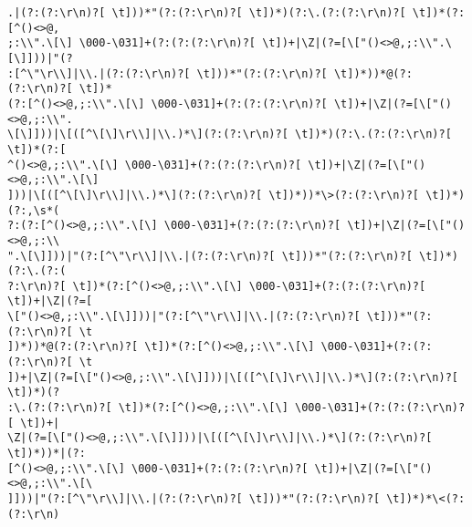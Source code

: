 \documentclass[14pt]{beamer}
\begin{document}
\begin{frame}[fragile]
\begin{lstlisting}
.|(?:(?:\r\n)?[ \t]))*"(?:(?:\r\n)?[ \t])*)(?:\.(?:(?:\r\n)?[ \t])*(?:[^()<>@,
;:\\".\[\] \000-\031]+(?:(?:(?:\r\n)?[ \t])+|\Z|(?=[\["()<>@,;:\\".\[\]]))|"(?
:[^\"\r\\]|\\.|(?:(?:\r\n)?[ \t]))*"(?:(?:\r\n)?[ \t])*))*@(?:(?:\r\n)?[ \t])*
(?:[^()<>@,;:\\".\[\] \000-\031]+(?:(?:(?:\r\n)?[ \t])+|\Z|(?=[\["()<>@,;:\\".
\[\]]))|\[([^\[\]\r\\]|\\.)*\](?:(?:\r\n)?[ \t])*)(?:\.(?:(?:\r\n)?[ \t])*(?:[
^()<>@,;:\\".\[\] \000-\031]+(?:(?:(?:\r\n)?[ \t])+|\Z|(?=[\["()<>@,;:\\".\[\]
]))|\[([^\[\]\r\\]|\\.)*\](?:(?:\r\n)?[ \t])*))*\>(?:(?:\r\n)?[ \t])*)(?:,\s*(
?:(?:[^()<>@,;:\\".\[\] \000-\031]+(?:(?:(?:\r\n)?[ \t])+|\Z|(?=[\["()<>@,;:\\
".\[\]]))|"(?:[^\"\r\\]|\\.|(?:(?:\r\n)?[ \t]))*"(?:(?:\r\n)?[ \t])*)(?:\.(?:(
?:\r\n)?[ \t])*(?:[^()<>@,;:\\".\[\] \000-\031]+(?:(?:(?:\r\n)?[ \t])+|\Z|(?=[
\["()<>@,;:\\".\[\]]))|"(?:[^\"\r\\]|\\.|(?:(?:\r\n)?[ \t]))*"(?:(?:\r\n)?[ \t
])*))*@(?:(?:\r\n)?[ \t])*(?:[^()<>@,;:\\".\[\] \000-\031]+(?:(?:(?:\r\n)?[ \t
])+|\Z|(?=[\["()<>@,;:\\".\[\]]))|\[([^\[\]\r\\]|\\.)*\](?:(?:\r\n)?[ \t])*)(?
:\.(?:(?:\r\n)?[ \t])*(?:[^()<>@,;:\\".\[\] \000-\031]+(?:(?:(?:\r\n)?[ \t])+|
\Z|(?=[\["()<>@,;:\\".\[\]]))|\[([^\[\]\r\\]|\\.)*\](?:(?:\r\n)?[ \t])*))*|(?:
[^()<>@,;:\\".\[\] \000-\031]+(?:(?:(?:\r\n)?[ \t])+|\Z|(?=[\["()<>@,;:\\".\[\
]]))|"(?:[^\"\r\\]|\\.|(?:(?:\r\n)?[ \t]))*"(?:(?:\r\n)?[ \t])*)*\<(?:(?:\r\n)

\end{lstlisting}
\end{frame}
\end{document}
